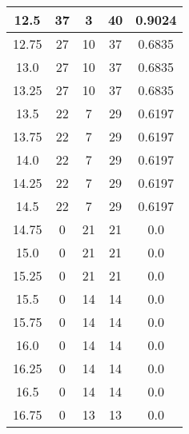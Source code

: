 \documentclass[letterpaper, 12pt]{article}
\begin{document}
\begin{longtable}{|c|c|c|c|c|}
12.5 & 37 & 3 & 40 & 0.9024 \\
\hline
12.75 & 27 & 10 & 37 & 0.6835 \\
\hline
13.0 & 27 & 10 & 37 & 0.6835 \\
\hline
13.25 & 27 & 10 & 37 & 0.6835 \\
\hline
13.5 & 22 & 7 & 29 & 0.6197 \\
\hline
13.75 & 22 & 7 & 29 & 0.6197 \\
\hline
14.0 & 22 & 7 & 29 & 0.6197 \\
\hline
14.25 & 22 & 7 & 29 & 0.6197 \\
\hline
14.5 & 22 & 7 & 29 & 0.6197 \\
\hline
14.75 & 0 & 21 & 21 & 0.0 \\
\hline
15.0 & 0 & 21 & 21 & 0.0 \\
\hline
15.25 & 0 & 21 & 21 & 0.0 \\
\hline
15.5 & 0 & 14 & 14 & 0.0 \\
\hline
15.75 & 0 & 14 & 14 & 0.0 \\
\hline
16.0 & 0 & 14 & 14 & 0.0 \\
\hline
16.25 & 0 & 14 & 14 & 0.0 \\
\hline
16.5 & 0 & 14 & 14 & 0.0 \\
\hline
16.75 & 0 & 13 & 13 & 0.0 \\
\hline
\end{longtable}
\end{document}
